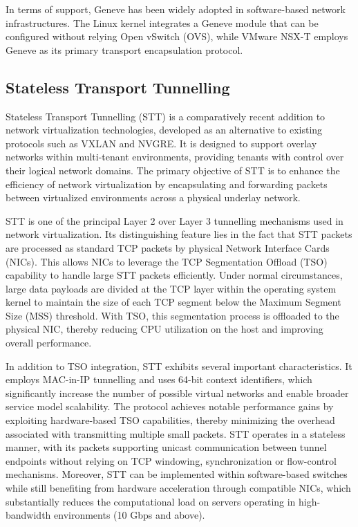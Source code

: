 In terms of support, Geneve has been widely adopted in software-based network infrastructures. The Linux kernel integrates a Geneve module that can be configured without relying Open vSwitch (OVS), while VMware NSX-T employs Geneve as its primary transport encapsulation protocol.

\subsection{Stateless Transport Tunnelling}

Stateless Transport Tunnelling (STT) is a comparatively recent addition to network virtualization technologies, developed as an alternative to existing protocols such as VXLAN and NVGRE. It is designed to support overlay networks within multi-tenant environments, providing tenants with control over their logical network domains. The primary objective of STT is to enhance the efficiency of network virtualization by encapsulating and forwarding packets between virtualized environments across a physical underlay network.

STT is one of the principal Layer 2 over Layer 3 tunnelling mechanisms used in network virtualization. Its distinguishing feature lies in the fact that STT packets are processed as standard TCP packets by physical Network Interface Cards (NICs). This allows NICs to leverage the TCP Segmentation Offload (TSO) capability to handle large STT packets efficiently. Under normal circumstances, large data payloads are divided at the TCP layer within the operating system kernel to maintain the size of each TCP segment below the Maximum Segment Size (MSS) threshold. With TSO, this segmentation process is offloaded to the physical NIC, thereby reducing CPU utilization on the host and improving overall performance.

In addition to TSO integration, STT exhibits several important characteristics. It employs MAC-in-IP tunnelling and uses 64-bit context identifiers, which significantly increase the number of possible virtual networks and enable broader service model scalability. The protocol achieves notable performance gains by exploiting hardware-based TSO capabilities, thereby minimizing the overhead associated with transmitting multiple small packets. STT operates in a stateless manner, with its packets supporting unicast communication between tunnel endpoints without relying on TCP windowing, synchronization or flow-control mechanisms. Moreover, STT can be implemented within software-based switches while still benefiting from hardware acceleration through compatible NICs, which substantially reduces the computational load on servers operating in high-bandwidth environments (10 Gbps and above).


